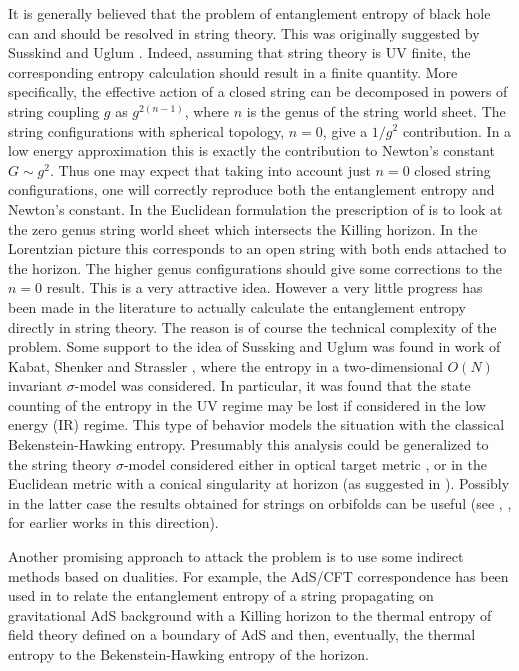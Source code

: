 \documentclass[12pt]{article}
\begin{document}
It is generally believed that the problem of  entanglement entropy of black hole can and should be resolved
in string theory. This was originally suggested by Susskind and Uglum \cite{Susskind:1994sm}. Indeed, assuming that string theory is UV finite, 
the corresponding entropy calculation should result in a finite quantity. More specifically, the effective action of a closed string can be decomposed
in powers of string coupling $g$ as $g^{2(n-1)}$, where $n$ is the genus of the string world sheet. The string configurations with spherical topology, $n=0$,
give  a $1/g^2$ contribution. In a low energy approximation this is exactly the contribution to Newton's constant $G\sim g^2$. Thus one may expect that taking into account just $n=0$  closed string configurations, one will correctly reproduce both the entanglement entropy and Newton's constant. In the Euclidean formulation the prescription of \cite{Susskind:1994sm} is to look at the zero genus string world sheet which intersects the Killing horizon. In the Lorentzian picture this corresponds to an open string with both ends attached to the horizon.  The higher genus configurations should give some corrections to the $n=0$ result. This is a very attractive idea. However a very little 
progress has been made in the literature to actually calculate the entanglement entropy directly in string theory. The reason is of course the technical complexity of the problem. 
Some support to the idea of Sussking and Uglum was found in work of Kabat,  Shenker and Strassler \cite{Kabat:1995jq},  where the entropy in a two-dimensional $O(N)$ invariant  $\sigma$-model was considered. In particular, it was found that the state counting of the entropy in the UV regime may be lost if considered in the low energy (IR) regime. This  type of behavior models the situation with the classical Bekenstein-Hawking entropy. Presumably this analysis could be generalized to the string theory $\sigma$-model considered either in optical target metric \cite{Barbon:1994ej}, \cite{Barbon:1994wa} or in the Euclidean metric with a conical singularity at horizon (as suggested in  \cite{Callan:1994py}). Possibly in the latter case the results obtained for strings on orbifolds \cite{Dixon:1985jw}
can be useful (see \cite{Dabholkar:1994ai}, \cite{Dabholkar:1994gg}, \cite{Dabholkar:2001if} for earlier works in this direction).

  Another  promising approach to attack the problem is to use some indirect methods based on dualities. For example, the AdS/CFT correspondence has been used in \cite{Brustein:2005vx}  to relate the entanglement entropy of a string propagating on gravitational AdS background with a Killing horizon 
to the thermal entropy of field theory defined on a boundary of AdS and then,  eventually, the thermal entropy  to the Bekenstein-Hawking entropy of the horizon.
\end{document}
